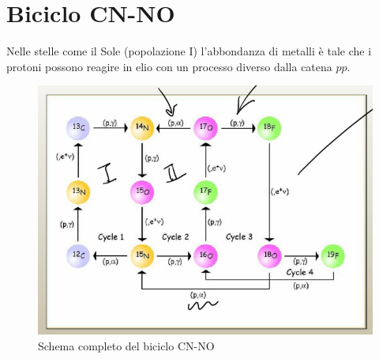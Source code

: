 \newpage
\section{Biciclo CN-NO}\label{sec-CNNO}
Nelle stelle come il Sole (popolazione I) l'abbondanza di metalli è tale che i protoni possono reagire in elio con un processo diverso dalla catena $pp$.
\begin{figure}[!h]
	\centering
	\includegraphics[scale=0.6]{Immagini/0422_CNO-complete-scheme.png}
	\caption{Schema completo del biciclo CN-NO}
	\label{0422_completescheme}
\end{figure}

